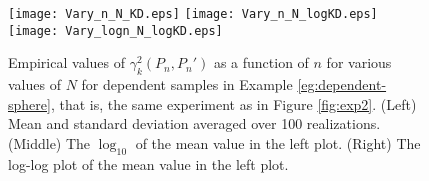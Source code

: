\documentclass{article}
\theoremstyle{definition}
\begin{document}
\begin{figure}[t]
\centering
   \texttt{[image: Vary\_n\_N\_KD.eps]}
    \texttt{[image: Vary\_n\_N\_logKD.eps]}
    \texttt{[image: Vary\_logn\_N\_logKD.eps]}
    \caption{
    Empirical values of $\gamma_k^2 (P_n, P_n')$  as a function of $n$ for various values of $N$ for dependent samples in Example  \ref{eg:dependent-sphere}, 
    that is, the same experiment as in Figure \ref{fig:exp2}.
    (Left) Mean and standard deviation averaged over 100 realizations. (Middle) The $\log_{10}$ of the mean value in the left plot. (Right) The log-log plot of the mean value in the left plot. 
%    
    \label{fig:ex_1_Fig_2d_supp}}
\end{figure}
\end{document}
